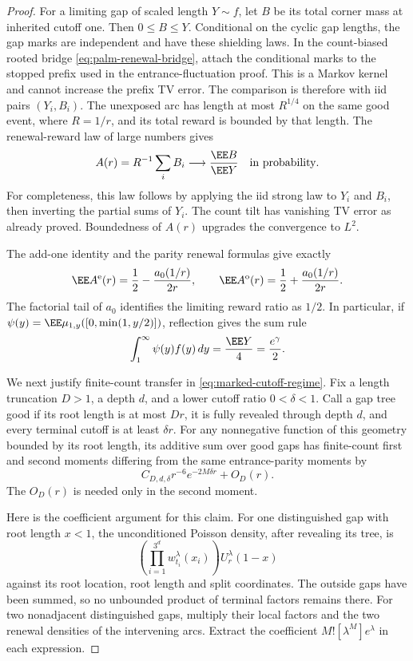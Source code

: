 \documentclass[11pt,letterpaper]{article}
\begin{document}
\begin{proof}
For a limiting gap of scaled length $Y\sim f$, let $B$ be its total
corner mass at inherited cutoff one. Then $0\le B\le Y$.
Conditional on the cyclic gap lengths, the gap marks are independent
and have these shielding laws. In the count-biased rooted bridge
\eqref{eq:palm-renewal-bridge}, attach the conditional marks to the
stopped prefix used in the entrance-fluctuation proof. This is a
Markov kernel and cannot increase the prefix TV error. The comparison
is therefore with iid pairs $(Y_i,B_i)$. The unexposed arc has length
at most $R^{1/4}$ on the same good event, where $R=1/r$, and its
total reward is bounded by that length. The renewal-reward law of
large numbers gives
\[
 A(r)=R^{-1}\sum_i B_i\longrightarrow\frac{\EE B}{\EE Y}
       \quad\hbox{in probability}.
\]
For completeness, this law follows by applying the iid strong law
to $Y_i$ and $B_i$, then inverting the partial sums of $Y_i$.
The count tilt has vanishing TV error as already proved.
Boundedness of $A(r)$ upgrades the convergence to $L^2$.

The add-one identity and the parity renewal formulas give exactly
\[
 \EE A^{\rm e}(r)=\frac12-\frac{a_0(1/r)}{2r},\qquad
 \EE A^{\rm o}(r)=\frac12+\frac{a_0(1/r)}{2r}.
\]
The factorial tail of $a_0$ identifies the limiting reward ratio as
$1/2$. In particular, if
$\psi(y)=\EE\mu_{1,y}([0,\min(1,y/2)])$, reflection gives the sum rule
\begin{equation}\label{eq:corner-reward-sum-rule}
 \int_1^\infty\psi(y)f(y)\,dy=\frac{\EE Y}{4}
                                           =\frac{e^\gamma}{2}.
\end{equation}

We next justify finite-count transfer in
\eqref{eq:marked-cutoff-regime}. Fix a length truncation $D>1$,
a depth $d$, and a lower cutoff ratio $0<\delta<1$.
Call a gap tree good if its root length is at most $Dr$, it is
fully revealed through depth $d$, and every terminal cutoff is at
least $\delta r$. For any nonnegative function of this geometry
bounded by its root length, its additive sum over good gaps has
finite-count first and second moments differing from the same
entrance-parity moments by
\begin{equation}\label{eq:local-marked-coefficient-error}
 C_{D,d,\delta}r^{-6}e^{-2M\delta r}+O_D(r).
\end{equation}
The $O_D(r)$ is needed only in the second moment.

Here is the coefficient argument for this claim. For one distinguished
gap with root length $x<1$, the unconditioned Poisson density, after
revealing its tree, is
\[
 \left(\prod_{i=1}^{3^d}w_{t_i}^{\lambda}(x_i)\right)
                         U_r^{\lambda}(1-x)
\]
against its root location, root length and split coordinates.
The outside gaps have been summed, so no unbounded product of
terminal factors remains there. For two nonadjacent distinguished
gaps, multiply their local factors and the two renewal densities
of the intervening arcs. Extract the coefficient
$M![\lambda^M]e^\lambda$ in each expression.


\end{proof}
\end{document}
